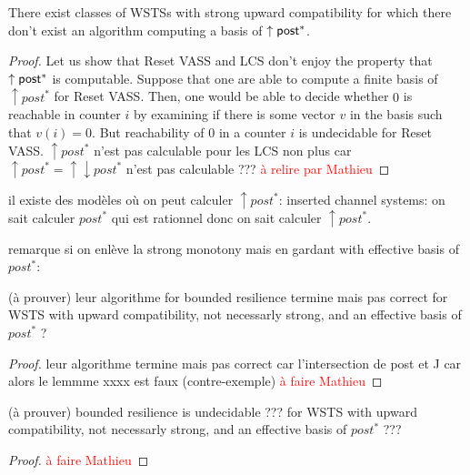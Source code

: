\begin{proposition}
There exist classes of WSTSs with strong upward compatibility for which there don't exist an algorithm computing a basis of $\uparrow \textsf{post}^*$.
\end{proposition}


\begin{proof}
Let us show that Reset VASS and LCS don't enjoy the property that $\uparrow \textsf{post}^*$ is computable.
Suppose that one are able to compute a finite basis of $\uparrow post^*$ for Reset VASS. Then, one would be able to decide whether $0$ is reachable in counter $i$ by examining if there is some vector $v$ in the basis such that $v(i)=0$. But reachability of $0$ in a counter $i$ is undecidable for Reset VASS. 
$\uparrow post^*$ n'est pas calculable pour les LCS non plus car $\uparrow post^*= \uparrow \downarrow post^*$ n'est pas calculable ???
\textcolor{red}{à relire par Mathieu}
\end{proof}

il existe des modèles où on peut calculer $\uparrow post^*$: inserted channel systems: on sait calculer $post^*$ qui est rationnel donc on sait calculer $\uparrow post^*$.

remarque si on enlève la strong monotony mais en gardant with effective basis of $post^*$:


\begin{proposition}(à prouver)
 leur algorithme for {\sc bounded resilience} termine mais pas correct for WSTS with upward compatibility, not necessarly strong, and an effective basis of $post^*$ ?
\end{proposition}

\begin{proof}
leur algorithme termine mais pas correct car l'intersection de post et J car alors le lemmme xxxx est faux (contre-exemple)
 \textcolor{red}{à faire Mathieu}
 
 
\end{proof}

\begin{theorem}(à prouver)
{\sc bounded resilience} is undecidable ??? for WSTS with upward compatibility, not necessarly strong, and an effective basis of $post^*$ ???
\end{theorem}

\begin{proof}
 \textcolor{red}{à faire Mathieu}
\end{proof}


